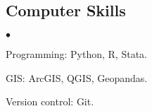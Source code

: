 \documentclass[margin,line]{res}
\newenvironment{list2}{
  \begin{list}{$\bullet$}{%
      \setlength{\itemsep}{0in}
      \setlength{\parsep}{0in} \setlength{\parskip}{0in}
      \setlength{\topsep}{0in} \setlength{\partopsep}{0in} 
      \setlength{\leftmargin}{0.2in}}}{\end{list}}
\begin{document}
\begin{resume}
\section{\sc Computer Skills} 
\begin{list2}
\item Programming: Python, R, Stata.
\item GIS:  ArcGIS, QGIS, Geopandas.
\item Version control: Git.\\ 
\end{list2}



\end{resume}
\end{document}
